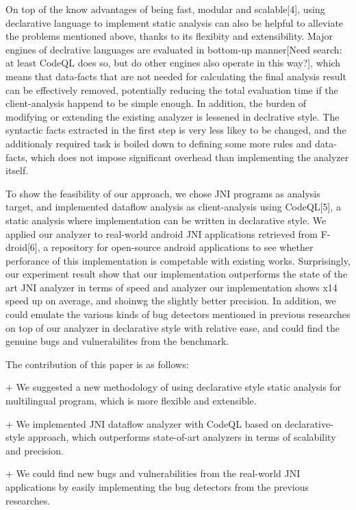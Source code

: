 On top of the know advantages of being fast, modular and scalable[4], using
declarative language to implement static analysis can also be helpful to
alleviate the problems mentioned above, thanks to its flexibity and extensibility.
Major engines of declrative languages are evaluated in bottom-up manner[Need
search: at least CodeQL does so, but do other engines also operate in this
way?], which means that data-facts that are not needed for calculating the
final analysis result can be effectively removed, potentially reducing the
total evaluation time if the client-analysis happend to be simple enough. In
addition, the burden of modifying or extending the existing analyzer is
lessened in declrative style.  The syntactic facts extracted in the first step
is very less likey to be changed, and the additionaly required task is boiled
down to defining some more rules and data-facts, which does not impose
significant overhead than implementing the analyzer itself.

To show the feasibility of our approach, we chose JNI programs as analysis
target, and implemented dataflow analysis as client-analysis using CodeQL[5], a
static analysis where implementation can be written in declarative style. We
applied our analyzer to real-world android JNI applications retrieved from
F-droid[6], a repository for open-source android applications to see whether
perforance of this implementation is competable with existing works.
Surprisingly, our experiment result show that our implementation outperforms
the state of the art JNI analyzer in terms of speed and analyzer our
implementation shows x14 speed up on average, and shoinwg the slightly better
precision. In addition, we could emulate the various kinds of bug detectors
mentioned in previous researches on top of our analyzer in declarative style
with relative ease, and could find the genuine bugs and vulnerabilites from the
benchmark.

The contribution of this paper is as follows:

+ We suggested a new methodology of using declarative style static analysis
for multilingual program, which is more flexible and extensible.

+ We implemented JNI dataflow analyzer with CodeQL based on declarative-style approach,
which outperforms state-of-art analyzers in terms of scalability and precision.

+ We could find new bugs and vulnerabilities from the real-world JNI applications
by easily implementing the bug detectors from the previous researches.
